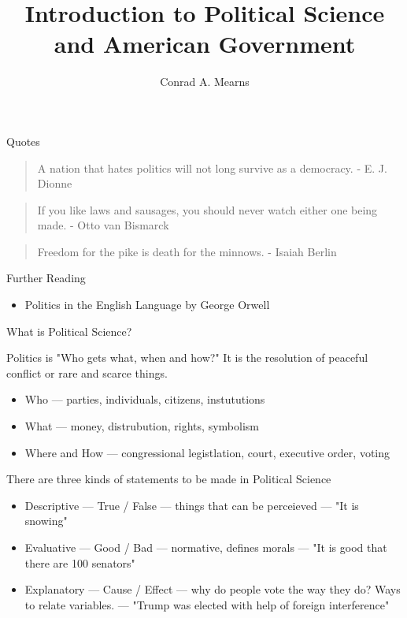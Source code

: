 \documentclass{article}
\title{Introduction to Political Science and American Government}
\author{Conrad A. Mearns}
\begin{document}
\maketitle

\noindent
\Large Quotes\\
\normalsize
\begin{quote}
  A nation that hates politics will not long survive as a democracy. - E. J. Dionne
\end{quote}
\begin{quote}
  If you like laws and sausages, you should never watch either one being made. - Otto van Bismarck
\end{quote}
\begin{quote}
  Freedom for the pike is death for the minnows. - Isaiah Berlin
\end{quote}

\noindent
\Large Further Reading\\
\normalsize
\begin{itemize}
  \item Politics in the English Language by George Orwell
\end{itemize}

\noindent
\Large
What is Political Science?\\
\normalsize

\noindent
Politics is "Who gets what, when and how?" It is the resolution of peaceful conflict or rare and scarce things.
\begin{itemize}
  \item Who --- parties, individuals, citizens, instututions
  \item What --- money, distrubution, rights, symbolism
  \item Where and How --- congressional legistlation, court, executive order, voting
\end{itemize}

\noindent
There are three kinds of statements to be made in Political Science
\begin{itemize}
  \item Descriptive --- True / False --- things that can be perceieved --- "It is snowing"
  \item Evaluative --- Good / Bad --- normative, defines morals --- "It is good that there are 100 senators"
  \item Explanatory --- Cause / Effect --- why do people vote the way they do? Ways to relate variables. --- "Trump was elected with help of foreign interference"
\end{itemize}
\end{document}
